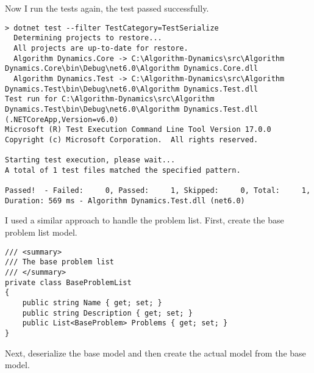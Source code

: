 \documentclass[report.tex]{subfiles}
\begin{document}
Now I run the tests again, the test passed successfully.

\begin{verbatim}
> dotnet test --filter TestCategory=TestSerialize
  Determining projects to restore...
  All projects are up-to-date for restore.
  Algorithm Dynamics.Core -> C:\Algorithm-Dynamics\src\Algorithm Dynamics.Core\bin\Debug\net6.0\Algorithm Dynamics.Core.dll
  Algorithm Dynamics.Test -> C:\Algorithm-Dynamics\src\Algorithm Dynamics.Test\bin\Debug\net6.0\Algorithm Dynamics.Test.dll
Test run for C:\Algorithm-Dynamics\src\Algorithm Dynamics.Test\bin\Debug\net6.0\Algorithm Dynamics.Test.dll (.NETCoreApp,Version=v6.0)
Microsoft (R) Test Execution Command Line Tool Version 17.0.0
Copyright (c) Microsoft Corporation.  All rights reserved.

Starting test execution, please wait...
A total of 1 test files matched the specified pattern.

Passed!  - Failed:     0, Passed:     1, Skipped:     0, Total:     1, Duration: 569 ms - Algorithm Dynamics.Test.dll (net6.0)
\end{verbatim}

I used a similar approach to handle the problem list. First, create the base problem list model.

\begin{verbatim}
/// <summary>
/// The base problem list 
/// </summary>
private class BaseProblemList
{
    public string Name { get; set; }
    public string Description { get; set; }
    public List<BaseProblem> Problems { get; set; }
}
\end{verbatim}

Next, deserialize the base model and then create the actual model from the base model.
\end{document}
